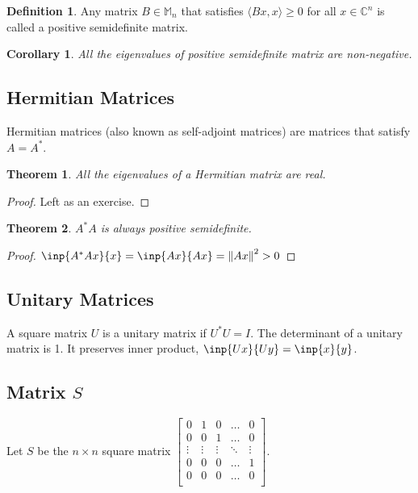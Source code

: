 \documentclass[twofold]{article}
\newcommand*\adj[1]{#1^*}
\newcommand*\norm[1]{\left \Vert #1 \right\Vert}
\theoremstyle{plain}
\newtheorem*{theorem}{Theorem}
\newtheorem*{corollary}{Corollary}
\theoremstyle{definition}
\newtheorem*{definition}{Definition}
\begin{document}
\begin{definition} Any matrix \(B \in \mathbb{M}_n\) that satisfies \(\langle Bx, x\rangle \ge 0\) for all \(x \in \mathbb{C}^n\) is called a positive semidefinite matrix. \end{definition}

\begin{corollary}All the eigenvalues of positive semidefinite matrix are non-negative. \end{corollary}


\subsection{Hermitian Matrices}
Hermitian matrices (also known as self-adjoint matrices) are matrices that satisfy \(A = \adj{A}\). 

\begin{theorem} All the eigenvalues of a Hermitian matrix are real. \end{theorem}

\begin{proof}Left as an exercise. \end{proof}




\begin{theorem} \(\adj{A} A\) is always positive semidefinite. \end{theorem}

\begin{proof} \(\inp{\adj{A} A x}{ x} = \inp{Ax}{Ax} = \norm{Ax}^2 > 0\)\end{proof}




\subsection{Unitary Matrices}

A square matrix \(U\) is a unitary matrix if \(\adj{U} U = I\). The determinant of a unitary matrix is 1. It preserves inner product, \(\inp{Ux}{Uy} = \inp{x}{y}\).

\subsection{Matrix \(S\)}
Let \(S\) be the \(n \times n\) square matrix \( \begin{bmatrix} 
0 & 1 & 0 & \ldots & 0 \\
0 & 0 & 1 & \ldots & 0 \\
\vdots & \vdots & \vdots &\ddots & \vdots \\
0 & 0 & 0 &\ldots & 1 \\
0 & 0 & 0 & \ldots & 0 \\ 
\end{bmatrix}\). 
\end{document}
